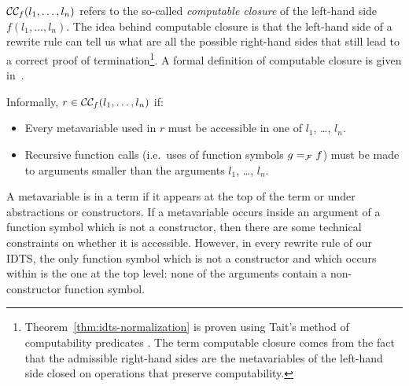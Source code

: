$\mathcal{C}\mathcal{C}_f(l_1, \ldots, l_n)$ refers to the so-called \emph{computable
  closure} of the left-hand side $f(l_1, \ldots, l_n)$. The idea behind
computable closure is that the left-hand side of a rewrite rule can tell us
what are all the possible right-hand sides that still lead to a correct
proof of termination\footnote{Theorem~\ref{thm:idts-normalization} is
  proven using Tait's method of computability predicates
  \cite{tait1967intensional}. The term computable closure comes from the
  fact that the admissible right-hand sides are the metavariables of the
  left-hand side closed on operations that preserve computability.}. A
formal definition of computable closure is given
in~\cite[p. 8]{blanqui2000termination}.

Informally, $r \in \mathcal{C}\mathcal{C}_f(l_1, \ldots, l_n)$ if:
\begin{itemize}
\item Every metavariable used in $r$ must be accessible in one of $l_1$,
  \ldots, $l_n$.
\item Recursive function calls (i.e.\ uses of function symbols $g =_{\mathcal{F}} f$)
  must be made to arguments smaller than the arguments $l_1$, \ldots,
  $l_n$.
\end{itemize}

A metavariable is  in a term if it appears at the top of
the term or under abstractions or constructors. If a metavariable occurs
inside an argument of a function symbol which is not a constructor, then
there are some technical constraints on whether it is accessible. However,
in every rewrite rule of our IDTS, the only function symbol which is not a
constructor and which occurs within is the one at the top level: none of
the arguments contain a non-constructor function symbol.


